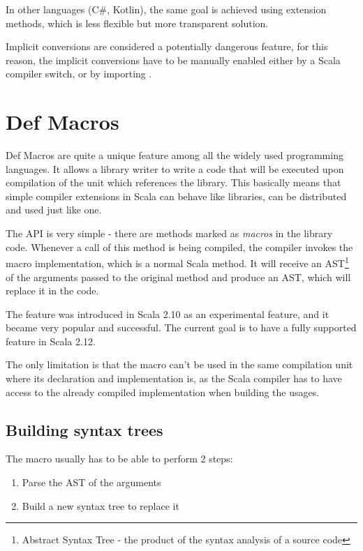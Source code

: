 In other languages (C\#, Kotlin), the same goal is achieved using extension methods, which is less flexible but more transparent solution.

Implicit conversions are considered a potentially dangerous feature, for this reason, the implicit conversions have to be manually enabled either by a Scala compiler switch, or by importing .

\section{Def Macros}
\label{sec:defmacros}

Def Macros are quite a unique feature among all the widely used programming languages. It allows a library writer to write a code that will be executed upon compilation of the unit which references the library. This basically means that simple compiler extensions in Scala can behave like libraries, can be distributed and used just like one.

The API is very simple - there are methods marked as \textit{macros} in the library code. Whenever a call of this method is being compiled, the compiler invokes the macro implementation, which is a normal Scala method. It will receive an AST\footnote{Abstract Syntax Tree - the product of the syntax analysis of a source code} of the arguments passed to the original method and produce an AST, which will replace it in the code.

The feature was introduced in Scala 2.10 as an experimental feature, and it became very popular and successful. The current goal is to have a fully supported feature in Scala 2.12.


The only limitation is that the macro can't be used in the same compilation unit where its declaration and implementation is, as the Scala compiler has to have access to the already compiled implementation when building the usages.

\subsection{Building syntax trees}
\label{subsec:buildingast}

The macro usually has to be able to perform 2 steps:

\begin{enumerate}
	\item Parse the AST of the arguments
	\item Build a new syntax tree to replace it
\end{enumerate}

